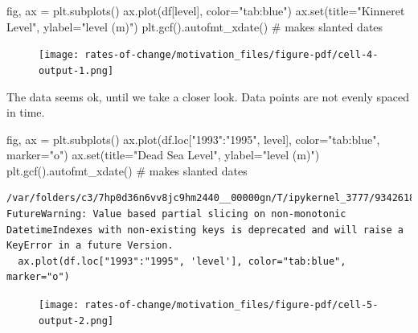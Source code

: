 \documentclass[
  letterpaper,
  DIV=11,
  numbers=noendperiod,
  oneside]{scrreprt}
\newenvironment{Shaded}{\begin{snugshade}}{\end{snugshade}}
\newcommand{\BuiltInTok}[1]{\textcolor[rgb]{0.00,0.23,0.31}{#1}}
\newcommand{\CommentTok}[1]{\textcolor[rgb]{0.37,0.37,0.37}{#1}}
\newcommand{\NormalTok}[1]{\textcolor[rgb]{0.00,0.23,0.31}{#1}}
\newcommand{\OperatorTok}[1]{\textcolor[rgb]{0.37,0.37,0.37}{#1}}
\newcommand{\StringTok}[1]{\textcolor[rgb]{0.13,0.47,0.30}{#1}}
\begin{document}
\begin{Shaded}
\begin{Highlighting}[]
\NormalTok{fig, ax }\OperatorTok{=}\NormalTok{ plt.subplots()}
\NormalTok{ax.plot(df[}\StringTok{\textquotesingle{}level\textquotesingle{}}\NormalTok{], color}\OperatorTok{=}\StringTok{"tab:blue"}\NormalTok{)}
\NormalTok{ax.}\BuiltInTok{set}\NormalTok{(title}\OperatorTok{=}\StringTok{"Kinneret Level"}\NormalTok{,}
\NormalTok{       ylabel}\OperatorTok{=}\StringTok{"level (m)"}\NormalTok{)}
\NormalTok{plt.gcf().autofmt\_xdate()  }\CommentTok{\# makes slanted dates}
\end{Highlighting}
\end{Shaded}

\begin{figure}[H]

{\centering \texttt{[image: rates-of-change/motivation\_files/figure-pdf/cell-4-output-1.png]}

}

\end{figure}

The data seems ok, until we take a closer look. Data points are not
evenly spaced in time.

\begin{Shaded}
\begin{Highlighting}[]
\NormalTok{fig, ax }\OperatorTok{=}\NormalTok{ plt.subplots()}
\NormalTok{ax.plot(df.loc[}\StringTok{"1993"}\NormalTok{:}\StringTok{"1995"}\NormalTok{, }\StringTok{\textquotesingle{}level\textquotesingle{}}\NormalTok{], color}\OperatorTok{=}\StringTok{"tab:blue"}\NormalTok{, marker}\OperatorTok{=}\StringTok{"o"}\NormalTok{)}
\NormalTok{ax.}\BuiltInTok{set}\NormalTok{(title}\OperatorTok{=}\StringTok{"Dead Sea Level"}\NormalTok{,}
\NormalTok{       ylabel}\OperatorTok{=}\StringTok{"level (m)"}\NormalTok{)}
\NormalTok{plt.gcf().autofmt\_xdate()  }\CommentTok{\# makes slanted dates}
\end{Highlighting}
\end{Shaded}

\begin{verbatim}
/var/folders/c3/7hp0d36n6vv8jc9hm2440__00000gn/T/ipykernel_3777/934261896.py:2: FutureWarning: Value based partial slicing on non-monotonic DatetimeIndexes with non-existing keys is deprecated and will raise a KeyError in a future Version.
  ax.plot(df.loc["1993":"1995", 'level'], color="tab:blue", marker="o")
\end{verbatim}

\begin{figure}[H]

{\centering \texttt{[image: rates-of-change/motivation\_files/figure-pdf/cell-5-output-2.png]}

}

\end{figure}
\end{document}
